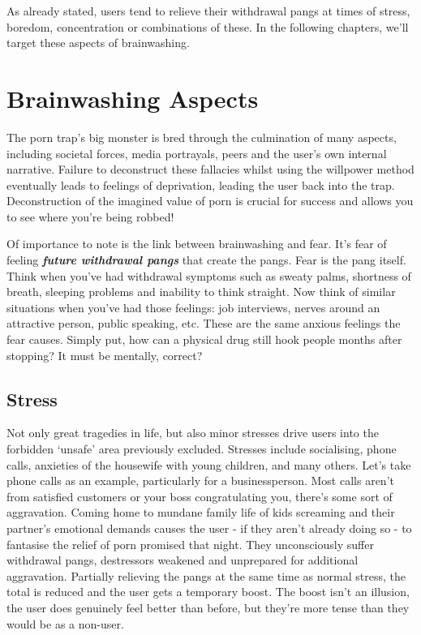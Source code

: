 \documentclass[
]{book}
\begin{document}
As already stated, users tend to relieve their withdrawal pangs at times of stress, boredom, concentration or combinations of these. In the following chapters, we'll target these aspects of brainwashing.

\hypertarget{brainwashing-aspects}{%
\chapter{Brainwashing Aspects}\label{brainwashing-aspects}}

The porn trap's big monster is bred through the culmination of many aspects, including societal forces, media portrayals, peers and the user's own internal narrative. Failure to deconstruct these fallacies whilst using the willpower method eventually leads to feelings of deprivation, leading the user back into the trap. Deconstruction of the imagined value of porn is crucial for success and allows you to see where you're being robbed!

Of importance to note is the link between brainwashing and fear. It's fear of feeling \textbf{\emph{future withdrawal pangs}} that create the pangs. Fear is the pang itself. Think when you've had withdrawal symptoms such as sweaty palms, shortness of breath, sleeping problems and inability to think straight. Now think of similar situations when you've had those feelings: job interviews, nerves around an attractive person, public speaking, etc. These are the same anxious feelings the fear causes. Simply put, how can a physical drug still hook people months after stopping? It must be mentally, correct?

\hypertarget{stress}{%
\section{Stress}\label{stress}}

Not only great tragedies in life, but also minor stresses drive users into the forbidden `unsafe' area previously excluded. Stresses include socialising, phone calls, anxieties of the housewife with young children, and many others. Let's take phone calls as an example, particularly for a businessperson. Most calls aren't from satisfied customers or your boss congratulating you, there's some sort of aggravation. Coming home to mundane family life of kids screaming and their partner's emotional demands causes the user - if they aren't already doing so - to fantasise the relief of porn promised that night. They unconsciously suffer withdrawal pangs, destressors weakened and unprepared for additional aggravation. Partially relieving the pangs at the same time as normal stress, the total is reduced and the user gets a temporary boost. The boost isn't an illusion, the user does genuinely feel better than before, but they're more tense than they would be as a non-user.
\end{document}
